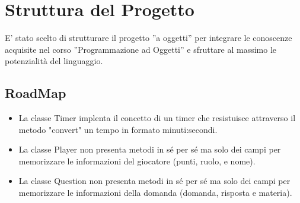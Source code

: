 \documentclass[a4paper,12pt]{report}
\begin{document}
\chapter{Struttura del Progetto}
E' stato scelto di strutturare il progetto ”a oggetti” per integrare le conoscenze acquisite nel corso ”Programmazione ad Oggetti” e sfruttare al massimo le potenzialità del linguaggio.
\section{RoadMap}
\begin{itemize}
\item La classe Timer implenta il concetto di un timer che resistuisce attraverso il metodo "convert" un tempo in formato minuti:secondi.
\item La classe Player non presenta metodi in sé per sé ma solo dei campi per memorizzare le informazioni del giocatore (punti, ruolo, e nome).
\item La classe Question non presenta metodi in sé per sé ma solo dei campi per memorizzare le informazioni della domanda (domanda, risposta e materia).
\end{itemize}
\end{document}
